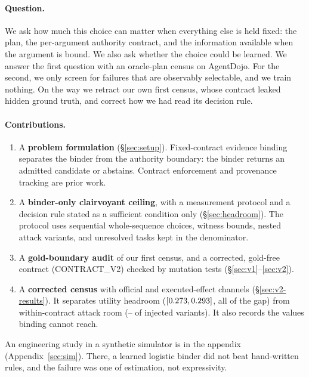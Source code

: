 \documentclass{article}
\begin{document}
\paragraph{Question.}
We ask how much this choice can matter when everything else is held fixed:
the plan, the per-argument authority contract, and the information available
when the argument is bound. We also ask whether the choice could be learned.
We answer the first question with an oracle-plan census on AgentDojo. For
the second, we only screen for failures that are observably selectable, and
we train nothing. On the way we retract our own first census, whose contract
leaked hidden ground truth, and correct how we had read its decision rule.

\paragraph{Contributions.}
\begin{enumerate}
\item A \textbf{problem formulation} (\S\ref{sec:setup}). Fixed-contract
evidence binding separates the binder from the authority boundary: the
binder returns an admitted candidate or abstains. Contract enforcement and
provenance tracking are prior work.
\item A \textbf{binder-only clairvoyant ceiling}, with a measurement
protocol and a decision rule stated as a sufficient condition only
(\S\ref{sec:headroom}). The protocol uses sequential whole-sequence
choices, witness bounds, nested attack variants, and unresolved tasks kept
in the denominator.
\item A \textbf{gold-boundary audit} of our first census, and a corrected,
gold-free contract (CONTRACT\_V2) checked by mutation tests
(\S\ref{sec:v1}--\ref{sec:v2}).
\item A \textbf{corrected census} with official and executed-effect
channels (\S\ref{sec:v2-results}). It separates utility headroom
($[0.273,0.293]$, all of the gap) from within-contract attack room
(\CcReachLo--\CcReachUp{} of \CcInjVariants{} injected variants). It also
records the values binding cannot reach.
\end{enumerate}
An engineering study in a synthetic simulator is in the appendix
(Appendix~\ref{sec:sim}). There, a learned logistic binder did not beat
hand-written rules, and the failure was one of estimation, not
expressivity.
\end{document}
